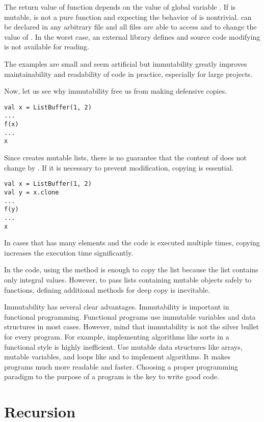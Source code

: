 The return value of function  depends on the value of global variable
. If  is mutable,  is not a pure function and expecting
the behavior of  is nontrivial.  can be declared in any arbitrary
file and all files are able to access  and to change the value of
. In the worst case, an external library defines  and source code
modifying  is not available for reading.

The examples are small and seem artificial but immutability greatly improves
maintainability and readability of code in practice, especially for large
projects.

Now, let us see why immutability free us from making defensive copies.

\begin{verbatim}
val x = ListBuffer(1, 2)
...
f(x)
...
x
\end{verbatim}

Since  creates mutable lists, there is no guarantee that the
content of  does not change by . If it is necessary to prevent
modification, copying  is essential.

\begin{verbatim}
val x = ListBuffer(1, 2)
val y = x.clone
...
f(y)
...
x
\end{verbatim}

In cases that  has many elements and the code is executed multiple times,
copying  increases the execution time significantly.

In the code, using the  method is enough to copy the list because the
list contains only integral values. However, to pass lists containing mutable
objects safely to functions, defining additional methods for deep copy is
inevitable.

Immutability has several clear advantages. Immutability is important in
functional programming. Functional programs use immutable variables and data
structures
in most cases. However, mind that immutability is not the silver bullet for every
program. For example, implementing algorithms like sorts in a functional style is
highly inefficient. Use mutable data structures like arrays, mutable variables,
and loops like  and  to implement algorithms. It makes
programs much more readable and faster. Choosing a proper programming paradigm to
the purpose of a program is the key to write good code.

\section{Recursion}

